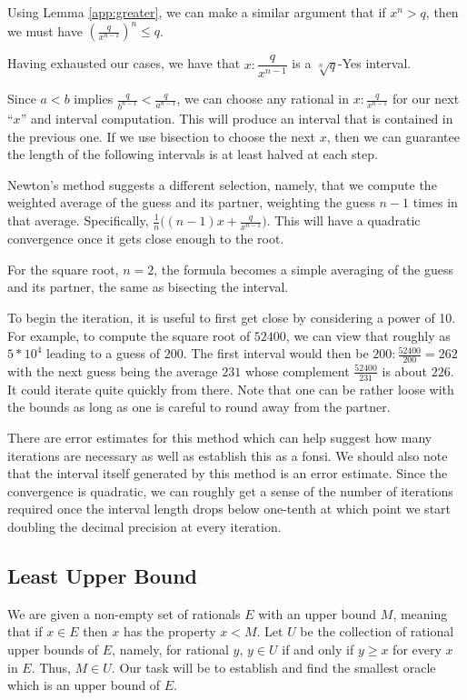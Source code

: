 \documentclass[12pt]{article}
\begin{document}
Using Lemma \ref{app:greater}, we can make a similar argument that if $x^n > q$, then we must have $(\frac{q}{x^{n-1}})^n \leq q$. 

Having exhausted our cases, we have that $x:\dfrac{q}{x^{n-1}}$ is a $\sqrt[n]{q}$-Yes interval.

Since $a<b$ implies $\frac{q}{b^{n-1}} < \frac{q}{a^{n-1}}$, we can choose any rational in $x:\frac{q}{x^{n-1}}$ for our next ``$x$'' and interval computation. This will produce an interval that is contained in the previous one. If we use bisection to choose the next $x$, then we can guarantee the length of the following intervals is at least halved at each step. 

Newton's method suggests a different selection, namely, that we compute the weighted average of the guess and its partner, weighting the guess $n-1$ times in that average. Specifically, $\frac{1}{n} \big( (n-1) x + \frac{q}{x^{n-1}} \big)$. This will have a quadratic convergence once it gets close enough to the root.

For the square root, $n=2$, the formula becomes a simple averaging of the guess and its partner, the same as bisecting the interval.  

To begin the iteration, it is useful to first get close by considering a power of 10. For example, to compute the square root of $52400$, we can view that roughly as $5*10^4$ leading to a guess of $200$. The first interval would then be $200: \frac{52400}{200} = 262$ with the next guess being the average $231$ whose complement $\frac{52400}{231}$ is about $226$. It could iterate quite quickly from there. Note that one can be rather loose with the bounds as long as one is careful to round away from the partner.  

There are error estimates for this method which can help suggest how many iterations are necessary as well as establish this as a fonsi. We should also note that the interval itself generated by this method is an error estimate. Since the convergence is quadratic, we can roughly get a sense of the number of iterations required once the interval length drops below one-tenth at which point we start doubling the decimal precision at every iteration.  


\subsection{Least Upper Bound}\label{sec:lub}

We are given a non-empty set of rationals $E$ with an upper bound $M$, meaning that if $x \in E$ then $x$ has the property $x < M$. Let $U$ be the collection of rational upper bounds of $E$, namely, for rational $y$, $y \in U$ if and only if $y \geq x$ for every $x$ in $E$.  Thus, $M \in U$. Our task will be to establish and find the smallest oracle which is an upper bound of $E$.
\end{document}
